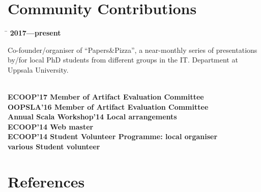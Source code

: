 \documentclass[10pt]{article} %
\begin{document}
\section{Community Contributions}
\begin{tabbing}
  \hspace{4cm}\=\kill
  \bf{2017---present}           \> \parbox{7cm}{Co-founder/organiser of ``Papers\&Pizza'', a
                                   near-monthly series of presentations by/for
                                   local PhD students from different groups in
                                   the IT. Department at Uppsala University.}\\[2mm]
  \bf{ECOOP'17}                 \> Member of Artifact Evaluation Committee\\[2mm]
  \bf{OOPSLA'16}                \> Member of Artifact Evaluation Committee\\[2mm]
  \bf{Annual Scala Workshop'14} \> Local arrangements\\[2mm]
  \bf{ECOOP'14}                 \> Web master\\[2mm]
  \bf{ECOOP'14}                 \> Student Volunteer Programme: local organiser\\[2mm]
  \bf{various}                  \> Student volunteer
\end{tabbing}


\section{References}

\end{document}
